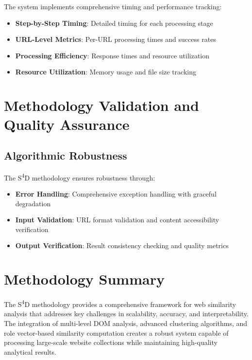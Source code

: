 The system implements comprehensive timing and performance tracking:

\begin{itemize}
    \item \textbf{Step-by-Step Timing}: Detailed timing for each processing stage
    \item \textbf{URL-Level Metrics}: Per-URL processing times and success rates
    \item \textbf{Processing Efficiency}: Response times and resource utilization
    \item \textbf{Resource Utilization}: Memory usage and file size tracking
\end{itemize}

\section{Methodology Validation and Quality Assurance}
\label{sec:methodology-validation}

\subsection{Algorithmic Robustness}
\label{subsec:algorithmic-robustness}

The S\textsuperscript{4}D methodology ensures robustness through:

\begin{itemize}
    \item \textbf{Error Handling}: Comprehensive exception handling with graceful degradation
    \item \textbf{Input Validation}: URL format validation and content accessibility verification
    \item \textbf{Output Verification}: Result consistency checking and quality metrics
\end{itemize}

\section{Methodology Summary}
\label{sec:methodology-summary}

The S\textsuperscript{4}D methodology provides a comprehensive framework for web similarity analysis that addresses key challenges in scalability, accuracy, and interpretability. The integration of multi-level DOM analysis, advanced clustering algorithms, and role vector-based similarity computation creates a robust system capable of processing large-scale website collections while maintaining high-quality analytical results.

